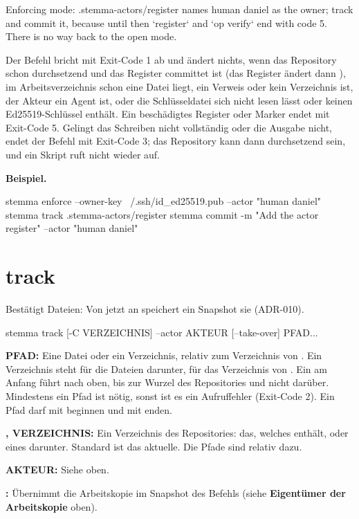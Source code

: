 \starttyping
Enforcing mode: .stemma-actors/register names human daniel as the owner;
track and commit it, because until then `register` and `op verify` end with
code 5. There is no way back to the open mode.
\stoptyping

Der Befehl bricht mit Exit-Code 1 ab und ändert nichts, wenn
das Repository schon durchsetzend und das Register committet ist
(das Register ändert dann ),
im Arbeitsverzeichnis schon eine Datei  liegt,
 ein Verweis oder kein Verzeichnis ist,
der Akteur ein Agent ist, oder die Schlüsseldatei sich nicht lesen lässt
oder keinen Ed25519-Schlüssel enthält.
Ein beschädigtes Register oder Marker endet mit Exit-Code 5.
Gelingt das Schreiben nicht vollständig oder die Ausgabe nicht, endet der Befehl mit Exit-Code 3;
das Repository kann dann durchsetzend sein, und ein Skript ruft  nicht wieder auf.

{\bf Beispiel.}

\starttyping
stemma enforce --owner-key ~/.ssh/id_ed25519.pub --actor "human daniel"
stemma track .stemma-actors/register
stemma commit -m "Add the actor register" --actor "human daniel"
\stoptyping

\section{track}

Bestätigt Dateien: Von jetzt an speichert ein Snapshot sie (ADR-010).

\starttyping
stemma track [-C VERZEICHNIS] --actor AKTEUR [--take-over] PFAD...
\stoptyping

\startitemize
\item {\bf PFAD:} Eine Datei oder ein Verzeichnis, relativ zum Verzeichnis von .
Ein Verzeichnis steht für die Dateien darunter,  für das Verzeichnis von .
Ein  am Anfang führt nach oben, bis zur Wurzel des Repositories und nicht darüber.
Mindestens ein Pfad ist nötig, sonst ist es ein Aufruffehler (Exit-Code 2).
Ein Pfad darf mit  beginnen und mit \type{/} enden.
\item {\bf {},  VERZEICHNIS:} Ein Verzeichnis des Repositories:
das, welches  enthält, oder eines darunter. Standard ist das aktuelle.
Die Pfade sind relativ dazu.
\item {\bf {} AKTEUR:} Siehe oben.
\item {\bf {}:} Übernimmt die Arbeitskopie im Snapshot des Befehls
(siehe {\bf Eigentümer der Arbeitskopie} oben).
\stopitemize


